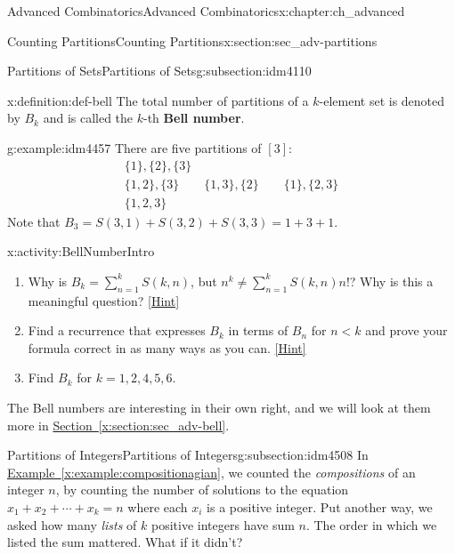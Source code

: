 \documentclass[oneside,10pt,]{book}
\newcommand{\terminology}[1]{\textbf{#1}}
\numberwithin{equation}{chapter}
\newcommand{\lt}{<}
\begin{document}
\begin{chapterptx}{Advanced Combinatorics}{}{Advanced Combinatorics}{}{}{x:chapter:ch_advanced}
\begin{sectionptx}{Counting Partitions}{}{Counting Partitions}{}{}{x:section:sec_adv-partitions}
\begin{subsectionptx}{Partitions of Sets}{}{Partitions of Sets}{}{}{g:subsection:idm4110}
\begin{definition}{}{x:definition:def-bell}%
%
%
The total number of partitions of a \(k\)-element set is denoted by \(B_k\) and is called the \(k\)-th \terminology{Bell number}.%
\end{definition}
\begin{example}{}{g:example:idm4457}%
There are five partitions of \([3]\):%
\begin{gather*}
\{1\}, \{2\},\{3\}\\
\{1,2\},\{3\} \qquad \{1,3\},\{2\} \qquad \{1\}, \{2,3\}\\
\{1,2,3\}
\end{gather*}
Note that \(B_3 = S(3,1)+S(3,2)+S(3,3) = 1 + 3 + 1\).%
\end{example}
\begin{activity}{}{x:activity:BellNumberIntro}%
\begin{enumerate}[font=\bfseries,label=(\alph*),ref=\alph*]
\item{}Why is \(B_k = \sum_{n=1}^{k} S(k,n)\), but \(n^k \ne \sum_{n=1}^k S(k,n)n!\)?  Why is this a meaningful question?%
\space\hspace*{0pt}\hfill{\tiny\hyperlink{g:hint:idm4471-back}{[Hint]}}\item{}Find a recurrence that expresses \(B_k\) in terms of \(B_n\) for \(n\lt  k\) and prove your formula correct in as many ways as you can.%
\space\hspace*{0pt}\hfill{\tiny\hyperlink{g:hint:idm4481-back}{[Hint]}}\item{}Find \(B_k\) for \(k=1,2,4,5,6\).%
\end{enumerate}
\end{activity}
The Bell numbers are interesting in their own right, and we will look at them more in \hyperref[x:section:sec_adv-bell]{Section~\ref{x:section:sec_adv-bell}}.%
\end{subsectionptx}
%
%
\typeout{************************************************}
\typeout{************************************************}
%
\begin{subsectionptx}{Partitions of Integers}{}{Partitions of Integers}{}{}{g:subsection:idm4508}
In \hyperref[x:example:compositionagian]{Example~\ref{x:example:compositionagian}}, we counted the \emph{compositions} of an integer \(n\), by counting the number of solutions to the equation \(x_1 + x_2 + \cdots + x_k = n\) where each \(x_i\) is a positive integer.  Put another way, we asked how many \emph{lists} of \(k\) positive integers have sum \(n\).  The order in which we listed the sum mattered.  What if it didn't?%

\end{subsectionptx}
\end{sectionptx}
\end{chapterptx}
\end{document}
